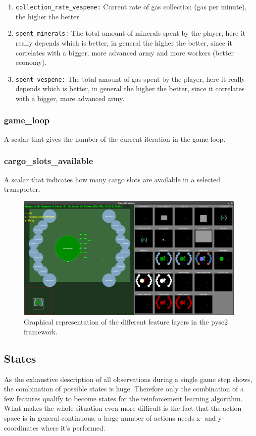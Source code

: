 \documentclass{article}
\begin{document}
\begin{enumerate}[noitemsep,start=0]
(minerals per minute), the higher the better.
\item \texttt{collection\_rate\_vespene:} Current rate of gas collection (gas 
per minute), the higher the better.
\item \texttt{spent\_minerals:} The total amount of minerals spent by the 
player, here it really depends which is better, in general the higher the 
better, since it correlates with a bigger, more advanced army and more workers 
(better economy).
\item \texttt{spent\_vespene:} The total amount of gas spent by the player, 
here it really depends which is better, in general the higher the better, since 
it correlates with a bigger, more advanced army.
\end{enumerate}


\subsubsection{game\_loop}
A scalar that gives the number of the current iteration in the game loop.


\subsubsection{cargo\_slots\_available}
A scalar that indicates how many cargo slots are available in a selected 
transporter.

\begin{figure}
\includegraphics[width=\textwidth]{state-actions-screenshot}
\caption{Graphical representation of the different feature layers in the pysc2 
framework.}
\label{screenshot}
\end{figure}


\subsection{States}
As the exhaustive description of all observations during a single game step 
shows, the combination of possible states is huge. Therefore only the 
combination of a few features qualify to become states for the reinforcement 
learning algorithm. What makes the whole situation even more difficult is the 
fact that the action space is in general continuous, a large number of actions 
needs x- and y-coordinates where it's performed.
\end{document}
